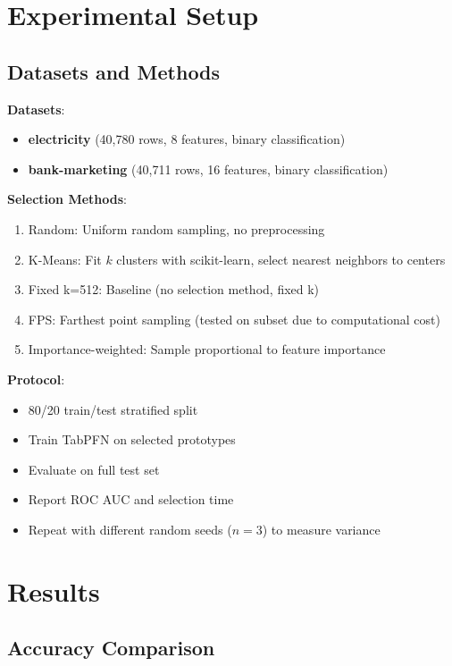 \documentclass[11pt,a4paper]{article}
\begin{document}
\section{Experimental Setup}

\subsection{Datasets and Methods}

\textbf{Datasets}:
\begin{itemize}
\item \textbf{electricity} (40,780 rows, 8 features, binary classification)
\item \textbf{bank-marketing} (40,711 rows, 16 features, binary classification)
\end{itemize}

\textbf{Selection Methods}:
\begin{enumerate}
\item Random: Uniform random sampling, no preprocessing
\item K-Means: Fit $k$ clusters with scikit-learn, select nearest neighbors to centers
\item Fixed k=512: Baseline (no selection method, fixed k)
\item FPS: Farthest point sampling (tested on subset due to computational cost)
\item Importance-weighted: Sample proportional to feature importance
\end{enumerate}

\textbf{Protocol}:
\begin{itemize}
\item 80/20 train/test stratified split
\item Train TabPFN on selected prototypes
\item Evaluate on full test set
\item Report ROC AUC and selection time
\item Repeat with different random seeds ($n=3$) to measure variance
\end{itemize}

\section{Results}

\subsection{Accuracy Comparison}
\end{document}
